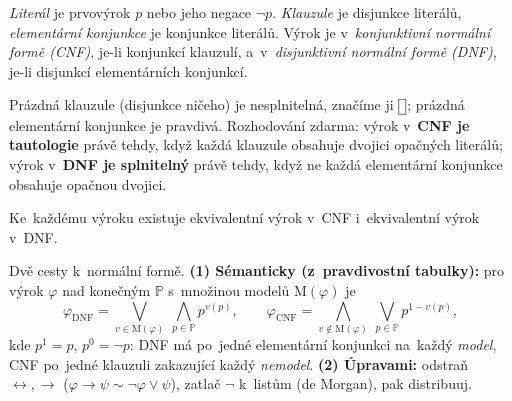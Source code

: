 \documentclass[11pt,a4paper]{article}
\newcommand{\Mset}{\mathrm{M}}              %
\newcommand{\eclause}{\mathord{\text{\framebox[1.25ex][c]{\rule{0pt}{0.95ex}}}}}
\begin{document}
\begin{definice}
\emph{Literál} je prvovýrok $p$ nebo jeho negace $\neg p$. \emph{Klauzule} je disjunkce literálů, \emph{elementární konjunkce} je konjunkce literálů. Výrok je v~\emph{konjunktivní normální formě (CNF)}, je-li konjunkcí klauzulí, a~v~\emph{disjunktivní normální formě (DNF)}, je-li disjunkcí elementárních konjunkcí.
\end{definice}

\begin{poznamka}
Prázdná klauzule (disjunkce ničeho) je nesplnitelná, značíme ji $\eclause$; prázdná elementární konjunkce je pravdivá. Rozhodování zdarma: výrok v~\textbf{CNF je tautologie} právě tehdy, když každá klauzule obsahuje dvojici opačných literálů; výrok v~\textbf{DNF je splnitelný} právě tehdy, když ne každá elementární konjunkce obsahuje opačnou dvojici.
\end{poznamka}

\begin{veta}
Ke~každému výroku existuje ekvivalentní výrok v~CNF i~ekvivalentní výrok v~DNF.
\end{veta}

\begin{intuice}
Dvě cesty k~normální formě. \textbf{(1) Sémanticky (z~pravdivostní tabulky):} pro výrok $\varphi$ nad konečným $\mathbb{P}$ s~množinou modelů $\Mset(\varphi)$ je
\[
\varphi_{\mathrm{DNF}}=\bigvee_{v\in\Mset(\varphi)}\ \bigwedge_{p\in\mathbb{P}}p^{v(p)},\qquad
\varphi_{\mathrm{CNF}}=\bigwedge_{v\notin\Mset(\varphi)}\ \bigvee_{p\in\mathbb{P}}p^{1-v(p)},
\]
kde $p^{1}=p$, $p^{0}=\neg p$: DNF má po~jedné elementární konjunkci na~každý \emph{model}, CNF po~jedné klauzuli zakazující každý \emph{nemodel}. \textbf{(2) Úpravami:} odstraň $\leftrightarrow,\to$ ($\varphi\to\psi\sim\neg\varphi\vee\psi$), zatlač $\neg$ k~listům (de Morgan), pak distribuuj.
\end{intuice}
\end{document}
